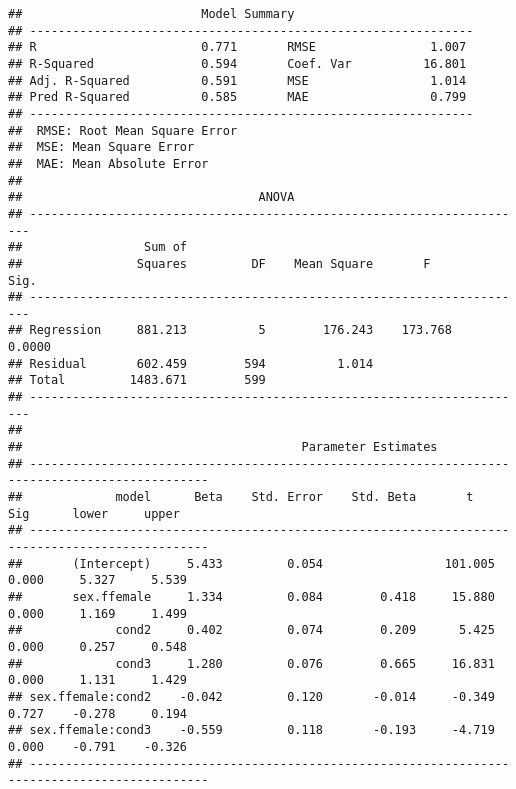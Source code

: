 \documentclass[]{article}
\newenvironment{Shaded}{\begin{snugshade}}{\end{snugshade}}
\newcommand{\CommentTok}[1]{\textcolor[rgb]{0.56,0.35,0.01}{\textit{#1}}}
\begin{document}
\begin{verbatim}
##                         Model Summary                          
## --------------------------------------------------------------
## R                       0.771       RMSE                1.007 
## R-Squared               0.594       Coef. Var          16.801 
## Adj. R-Squared          0.591       MSE                 1.014 
## Pred R-Squared          0.585       MAE                 0.799 
## --------------------------------------------------------------
##  RMSE: Root Mean Square Error 
##  MSE: Mean Square Error 
##  MAE: Mean Absolute Error 
## 
##                                 ANOVA                                  
## ----------------------------------------------------------------------
##                 Sum of                                                
##                Squares         DF    Mean Square       F         Sig. 
## ----------------------------------------------------------------------
## Regression     881.213          5        176.243    173.768    0.0000 
## Residual       602.459        594          1.014                      
## Total         1483.671        599                                     
## ----------------------------------------------------------------------
## 
##                                       Parameter Estimates                                       
## -----------------------------------------------------------------------------------------------
##             model      Beta    Std. Error    Std. Beta       t        Sig      lower     upper 
## -----------------------------------------------------------------------------------------------
##       (Intercept)     5.433         0.054                 101.005    0.000     5.327     5.539 
##       sex.ffemale     1.334         0.084        0.418     15.880    0.000     1.169     1.499 
##             cond2     0.402         0.074        0.209      5.425    0.000     0.257     0.548 
##             cond3     1.280         0.076        0.665     16.831    0.000     1.131     1.429 
## sex.ffemale:cond2    -0.042         0.120       -0.014     -0.349    0.727    -0.278     0.194 
## sex.ffemale:cond3    -0.559         0.118       -0.193     -4.719    0.000    -0.791    -0.326 
## -----------------------------------------------------------------------------------------------
\end{verbatim}

\begin{Shaded}
\end{Shaded}
\end{document}
